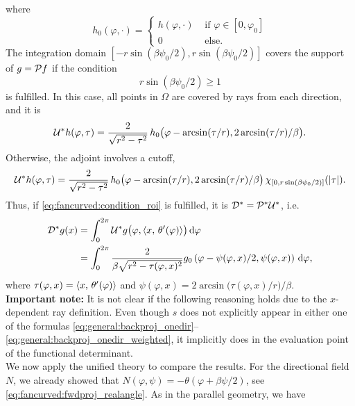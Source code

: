 \documentclass{amsart}
\renewcommand*{\phi}{\varphi}
\begin{document}
%
where
%
\begin{equation*}
 h_0(\phi, \cdot) =
 \begin{cases}
  h(\phi, \cdot) & \text{ if } \phi \in [0,\phi_0] \\
  0 & \text{ else}.
 \end{cases}
\end{equation*}
%
The integration domain $[-r\sin(\beta\psi_0/2), r\sin(\beta\psi_0/2)]$ covers the support of $g = {\mathcal{P}} f$ if the condition
%
\begin{equation}
 \label{eq:fancurved:condition_roi}
 r \sin(\beta\psi_0/2) \geq 1
\end{equation}
%
is fulfilled. In this case, all points in $\Omega$ are covered by rays from each direction, and it is
%
\begin{equation}
 \label{eq:fancurved:unit_trafo_adj_good}
 \DUALOPU h(\phi, \tau) = \frac{2}{\sqrt{r^2-\tau^2}} \, h_0\big(\phi - \arcsin(\tau/r), 2\arcsin(\tau/r)/\beta\big).
\end{equation}
%
Otherwise, the adjoint involves a cutoff,
%
\begin{equation}
 \label{eq:fancurved:unit_trafo_adj_bad}
 \DUALOPU h(\phi, \tau) = \frac{2}{\sqrt{r^2-\tau^2}} \, h_0\big(\phi - \arcsin(\tau/r), 2\arcsin(\tau/r)/\beta\big)\, 
 \chi_{[0, r\sin(\beta\psi_0/2)]}(\ABS{\tau}).
\end{equation}
%
Thus, if \eqref{eq:fancurved:condition_roi} is fulfilled, it is ${{\mathcal{D}}^*} = {{\mathcal{P}}^*}{{\mathcal{U}}^*}$, i.e.
%
\begin{align}
 \DUALOPD g(x)
 &= \int_0^{2\pi} \DUALOPU g\big(\phi, \INNER{x}{\theta'(\phi)}\big)\, \D\phi \notag\\
 \label{eq:fancurved:backproj}
 &= \int_0^{2\pi} \frac{2}{\beta\sqrt{r^2-\tau(\phi, x)^2}} g_0\left(\phi - \psi(\phi,x)/2, \psi(\phi,x) \right)\, \D\phi,
\end{align}
%
where $\tau(\phi,x) = \INNER{x}{\theta'(\phi)}$ and $\psi(\phi,x) = 2\arcsin\big(\tau(\phi,x)/r\big) / \beta$.\\[1ex]
%
\textbf{Important note:} It is not clear if the following reasoning holds due to the $x$-dependent ray definition. Even though $s$ does 
not explicitly appear in either one of the formulas \eqref{eq:general:backproj_onedir}--\eqref{eq:general:backproj_onedir_weighted}, it 
implicitly does in the evaluation point of the functional determinant.\\[1ex]
%
We now apply the unified theory to compare the results. For the directional field $N$, we already showed that 
$N(\phi,\psi) = -\theta(\phi + \beta\psi/2)$, see \eqref{eq:fancurved:fwdproj_realangle}. As in the parallel geometry, we have 
\end{document}
